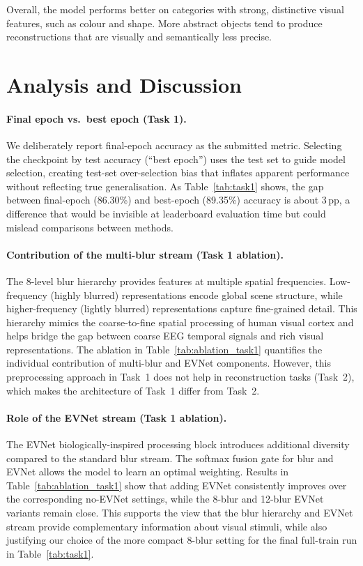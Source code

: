 \documentclass[11pt]{article}
\begin{document}
Overall, the model performs better on categories with strong, distinctive visual features, such as colour and shape.
More abstract objects tend to produce reconstructions that are visually and semantically less precise.

\section{Analysis and Discussion}

\paragraph{Final epoch vs.\ best epoch (Task 1).}
We deliberately report final-epoch accuracy as the submitted metric.
Selecting the checkpoint by test accuracy (``best epoch'') uses the test set to guide model selection, creating test-set over-selection bias that inflates apparent performance without reflecting true generalisation.
As Table~\ref{tab:task1} shows, the gap between final-epoch (86.30\%) and best-epoch (89.35\%) accuracy is about 3\,pp, a difference that would be invisible at leaderboard evaluation time but could mislead comparisons between methods.

\paragraph{Contribution of the multi-blur stream (Task 1 ablation).}
The 8-level blur hierarchy provides features at multiple spatial frequencies.
Low-frequency (highly blurred) representations encode global scene structure, while higher-frequency (lightly blurred) representations capture fine-grained detail.
This hierarchy mimics the coarse-to-fine spatial processing of human visual cortex and helps bridge the gap between coarse EEG temporal signals and rich visual representations.
The ablation in Table~\ref{tab:ablation_task1} quantifies the individual contribution of multi-blur and EVNet components. However, this preprocessing approach in Task~1 does not help in reconstruction tasks (Task~2), which makes the architecture of Task~1 differ from Task~2.

\paragraph{Role of the EVNet stream (Task 1 ablation).}
The EVNet biologically-inspired processing block introduces additional diversity compared to the standard blur stream.
The softmax fusion gate for blur and EVNet allows the model to learn an optimal weighting.
Results in Table~\ref{tab:ablation_task1} show that adding EVNet consistently improves over the corresponding no-EVNet settings, while the 8-blur and 12-blur EVNet variants remain close.
This supports the view that the blur hierarchy and EVNet stream provide complementary information about visual stimuli, while also justifying our choice of the more compact 8-blur setting for the final full-train run in Table~\ref{tab:task1}.
\end{document}

